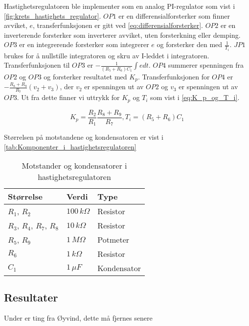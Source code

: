 Hastighetsregulatoren ble implementer som en analog PI-regulator som vist i \autoref{fig:krets_hastighets_regulator}. $OP1$ er en differensialforsterker som finner avviket, $e$, transferfunksjonen er gitt ved \autoref{eq:differensialforsterker}.
$OP2$ er en inverterende forsterker som inverterer avviket, uten forsterkning eller demping.
$OP3$ er en integrerende forsterker som integrerer $e$ og forsterker den med $\frac{1}{T_i}$. $JP1$ brukes for å nullstille integratoren og skru av I-leddet i integratoren. Transferfunksjonen til $OP3$ er $-\frac{1}{(R_5 + R_6) C_1} \int e dt$.
$OP4$ summerer spenningen fra $OP2$ og $OP3$ og forsterker resultatet med $K_p$. Transferfunksjonen for $OP4$ er $-\frac{R_8 + R_9}{R_7}(v_2 + v_3)$, der $v_2$ er spenningen ut av $OP2$ og $v_3$ er spenningen ut av $OP3$. Ut fra dette finner vi uttrykk for $K_p$ og $T_i$ som vist i \autoref{eq:K_p_og_T_i}.

\begin{equation}
    \label{eq:K_p_og_T_i}
    K_p = \frac{R_2}{R_1} \frac{R_8 + R_9}{R_7},
    T_i = (R_5 + R_6) C_1
\end{equation}

Størrelsen på motstandene og kondensatoren er vist i \autoref{tab:Komponenter_i_hastighetsregulatoren}

\begin{table}
    \centering
    \caption{Motstander og kondensatorer i hastighetsregulatoren}
    \begin{tabular}{lll}
        \toprule
        Størrelse & Verdi & Type \\
		\midrule
        $R_1$, $R_2$ & $100\,k\Omega$ & Resistor\\
        $R_3$, $R_4$, $R_7$, $R_8$ & $10\,k\Omega$ & Resistor \\
        $R_5$, $R_9$ & $1\,M\Omega$ & Potmeter \\
        $R_6$ & $1\,k\Omega$ & Resistor \\
        $C_1$ & $1\,\mu F$ & Kondensator \\
        \bottomrule
    \end{tabular}
    \label{tab:Komponenter_i_hastighetsregulatoren}
\end{table}

\subsection{Resultater}


Under er ting fra Øyvind, dette må fjernes senere

